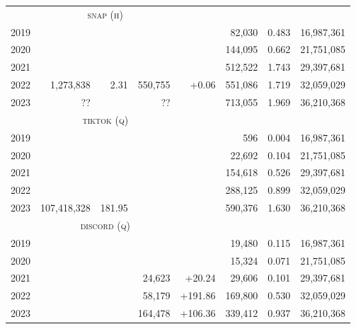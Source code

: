 \documentclass[nonacm,screen]{acmart}
\newcommand\missing{\multicolumn{1}{r}{??}}
\begin{document}
\begin{itemize}
\begin{table}
\begin{tabular}{r@{\hskip 1.5em}rrr r@{\hskip 1.5em}rrr}
& \multicolumn{3}{c}{\textsc{\MakeLowercase{Snap (H)}}} & & & & \\ \cmidrule{2-4}
\color{lowlight} 2019 &             &        &            &         &     82,030 &  0.483 & \color{lowlight} 16,987,361 \\
\color{lowlight} 2020 &             &        &            &         &    144,095 &  0.662 & \color{lowlight} 21,751,085 \\
\color{lowlight} 2021 &             &        &            &         &    512,522 &  1.743 & \color{lowlight} 29,397,681 \\
\color{lowlight} 2022 &   1,273,838 &   2.31 &    550,755 &   +0.06 &    551,086 &  1.719 & \color{lowlight} 32,059,029 \\
\color{lowlight} 2023 &    \missing &        &   \missing &         &    713,055 &  1.969 & \color{lowlight} 36,210,368 \\[2ex]

& \multicolumn{3}{c}{\textsc{\MakeLowercase{TikTok (Q)}}} & & & & \\ \cmidrule{2-4}
\color{lowlight} 2019 &             &        &           &          &        596 &  0.004 & \color{lowlight} 16,987,361 \\
\color{lowlight} 2020 &             &        &           &          &     22,692 &  0.104 & \color{lowlight} 21,751,085 \\
\color{lowlight} 2021 &             &        &           &          &    154,618 &  0.526 & \color{lowlight} 29,397,681 \\
\color{lowlight} 2022 &             &        &           &          &    288,125 &  0.899 & \color{lowlight} 32,059,029 \\
\color{lowlight} 2023 & 107,418,328 & 181.95 &           &          &    590,376 &  1.630 & \color{lowlight} 36,210,368 \\[2ex]

& \multicolumn{3}{c}{\textsc{\MakeLowercase{Discord (Q)}}} & & & & \\ \cmidrule{2-4}
\color{lowlight} 2019 &             &        &           &          &     19,480 &  0.115 & \color{lowlight} 16,987,361 \\
\color{lowlight} 2020 &             &        &           &          &     15,324 &  0.071 & \color{lowlight} 21,751,085 \\
\color{lowlight} 2021 &             &        &    24,623 &   +20.24 &     29,606 &  0.101 & \color{lowlight} 29,397,681 \\
\color{lowlight} 2022 &             &        &    58,179 &  +191.86 &    169,800 &  0.530 & \color{lowlight} 32,059,029 \\
\color{lowlight} 2023 &             &        &   164,478 &  +106.36 &    339,412 &  0.937 & \color{lowlight} 36,210,368 \\


\end{tabular}
\end{table}
\end{itemize}
\end{document}
